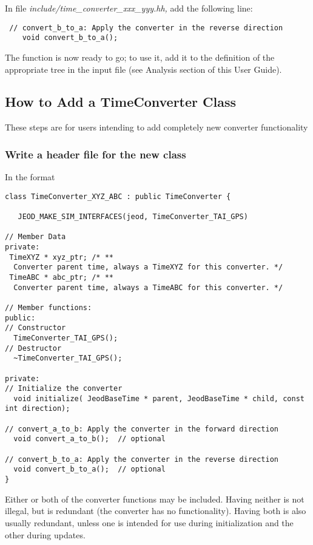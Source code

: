 In file \textit{include/time\_converter\_xxx\_yyy.hh, }add the following
line:

\begin{verbatim}
 // convert_b_to_a: Apply the converter in the reverse direction
    void convert_b_to_a();
\end{verbatim}

The function is now ready to go; to use it, add it to the definition of
the appropriate tree in the input file (see Analysis section of this
User Guide).







\subsection{How to Add a TimeConverter Class}
These steps are for users intending to add completely new converter
functionality

\subsubsection{Write a header file for the new class}
In the format

\begin{verbatim}
class TimeConverter_XYZ_ABC : public TimeConverter {

   JEOD_MAKE_SIM_INTERFACES(jeod, TimeConverter_TAI_GPS)

// Member Data
private:
 TimeXYZ * xyz_ptr; /* **
  Converter parent time, always a TimeXYZ for this converter. */
 TimeABC * abc_ptr; /* **
  Converter parent time, always a TimeABC for this converter. */

// Member functions:
public:
// Constructor
  TimeConverter_TAI_GPS();
// Destructor
  ~TimeConverter_TAI_GPS();

private:
// Initialize the converter
  void initialize( JeodBaseTime * parent, JeodBaseTime * child, const int direction);

// convert_a_to_b: Apply the converter in the forward direction
  void convert_a_to_b();  // optional

// convert_b_to_a: Apply the converter in the reverse direction
  void convert_b_to_a();  // optional
}
\end{verbatim}

Either or both of the converter functions may be included.  Having
neither is not illegal, but is redundant (the converter has no
functionality).  Having both is also usually redundant, unless one is
intended for use during initialization and the other during updates.

